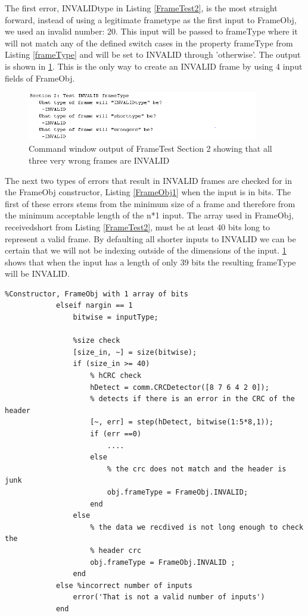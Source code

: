 The first error, INVALIDtype in Listing \ref{FrameTest2}, is the most straight forward, instead of using a legitimate frametype as the first input to FrameObj, we used an invalid number: 20. This input will be passed to frameType where it will not match any of the defined switch cases in the property frameType from Listing \ref{frameType} and will be set to INVALID through 'otherwise'. The output is shown in \ref{fig:FrameTest2}.  This is the only way to create an INVALID frame by using 4 input fields of FrameObj. 

\begin{figure}[h]
    \includegraphics[width=0.9\textwidth, left]{FrameTest2.PNG}
    \caption{Command window output of FrameTest Section 2 showing that all three very wrong frames are INVALID }
    \label{fig:FrameTest2}
\end{figure}

The next two types of errors that result in INVALID frames are checked for in the FrameObj constructor, Listing \ref{FrameObj1} when the input is in bits. The first of these errors stems from the minimum size of a frame and therefore from the minimum acceptable length of the n*1 input. The array used in FrameObj, receivedshort from Listing \ref{FrameTest2},  must be at least 40 bits long to represent a valid frame. By defaulting all shorter inputs to INVALID we can be certain that we will not be indexing outside of the dimensions of the input. \ref{fig:FrameTest2} shows that when the input has a length of only 39 bits the resulting frameType will be INVALID. 

\begin{lstlisting} 
%Constructor, FrameObj with 1 array of bits
            elseif nargin == 1
                bitwise = inputType;
                 
                %size check
                [size_in, ~] = size(bitwise);
                if (size_in >= 40)
                    % hCRC check
                    hDetect = comm.CRCDetector([8 7 6 4 2 0]);
                    % detects if there is an error in the CRC of the header
                    [~, err] = step(hDetect, bitwise(1:5*8,1));
                    if (err ==0)
						....
                    else
                        % the crc does not match and the header is junk
                        obj.frameType = FrameObj.INVALID;
                    end
                else
                    % the data we recdived is not long enough to check the
                    % header crc
                    obj.frameType = FrameObj.INVALID ;     
                end
            else %incorrect number of inputs
                error('That is not a valid number of inputs')
            end
\end{lstlisting} 

